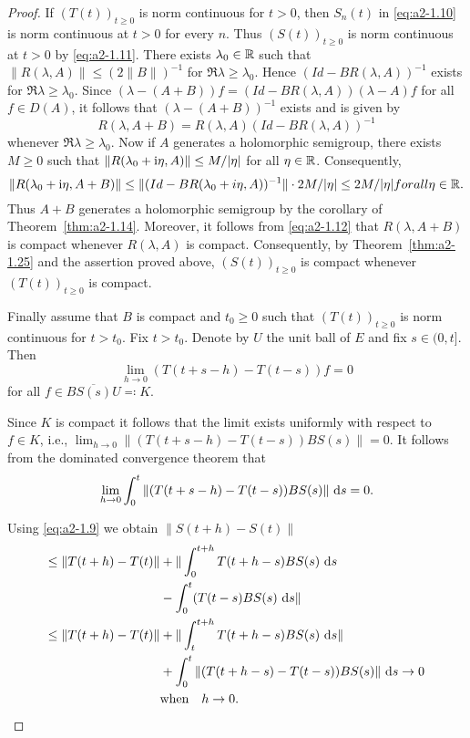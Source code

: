 \begin{proof}
If $(T(t))_{t \geq 0}$ is norm continuous for $t > 0$, then $S_{n}(t)$ in \eqref{eq:a2-1.10} is norm continuous at $t > 0$ for every $n$.
Thus $(S(t))_{t \geq 0}$ is norm continuous at $t > 0$ by \eqref{eq:a2-1.11}.
There exists $\lambda_{0} \in \mathbb{R}$ such that 
$\|R(\lambda,A)\| \leq (2\|B\|)^{-1}$ for $\Re\lambda \geq \lambda_{0}$.
Hence $(Id - BR(\lambda,A))^{-1}$ exists for $\Re\lambda \geq \lambda_{0}$.
Since $(\lambda-(A+B))f = (Id-BR(\lambda,A))(\lambda-A)f$ for all $f \in D(A)$, it follows that $(\lambda-(A+B))^{-1}$ exists and is given by
\begin{equation}\label{eq:a2-1.12}
    R(\lambda,A+B) = R(\lambda,A)(Id-BR(\lambda,A))^{-1}
\end{equation}
whenever $\Re\lambda \geq \lambda_{0}$.
Now if $A$ generates a holomorphic semigroup,
there exists $M \geq 0$ such that $\|R(\lambda_{0}+\mathrm{i}\eta,A)\| \leq M/|\eta|$ for all $\eta \in \mathbb{R}$.
Consequently, 
\[
\|R(\lambda_{0}+\mathrm{i}\eta,A+B)\| \leq \|(Id-BR(\lambda_{0}+i\eta,A))^{-1}\| \cdot 2M/|\eta| \leq 2M/|\eta|
for all \eta \in \mathbb{R} .
\]
Thus $A + B$ generates a holomorphic semigroup by the corollary of Theorem~\ref{thm:a2-1.14}.
Moreover, it follows from \eqref{eq:a2-1.12}  that $R(\lambda,A+B)$ is compact whenever $R(\lambda,A)$  is compact.
Consequently, by Theorem~\ref{thm:a2-1.25} and the  assertion proved above, $(S(t))_{t \geq 0}$ is compact whenever $(T(t))_{t \geq 0}$ is compact.

Finally assume that $B$ is compact and $t_{0} \geq 0$ such that $(T(t))_{t \geq 0}$ 
is norm continuous for $t > t_{0}$.
Fix $t > t_{0}$.
Denote by $U$ the unit ball of $E$ and fix $s \in (0,t]$.
Then
\[
    \lim_{h \to 0} (T(t+s-h) - T(t-s))f = 0
\]
for all $f \in \overline{BS(s)U} \eqqcolon K$.

Since $K$ is compact it follows that the limit exists uniformly with respect to $f \in K$, i.e., 
$\lim_{h \to 0} \|(T(t+s-h) - T(t-s))BS(s)\| = 0$.
It follows from the dominated convergence theorem that
\begin{equation}\label{eq:a2-1.13}
    \lim_{h \to 0} \int_{0}^{t} \|(T(t+s-h) - T(t-s))BS(s)\|\, \mathop{}\!\mathrm{d}{s} = 0.
\end{equation}
 
Using  \eqref{eq:a2-1.9}  we obtain $\|S(t+h) - S(t)\|$ 
\begin{align*}
\leq \|T(t+h) - T(t)\| &+ \|\int_{0}^{t+h} T(t+h-s)BS(s)\, \ds\ \hfill \\
 &- \int_{0}^{t} (T(t-s)BS(s)\, \ds\| \hfill \\
\leq \|T(t+h) - T(t)\| &+ \|\int_{t}^{t+h} T(t+h-s)BS(s)\, \ds\| \hfill \\ 
 &+ \int_{0}^{t} \|(T(t+h-s) - T(t-s))BS(s)\|\, \ds \to 0 \hfill \\
 &\text{when}  \quad h \to 0. \hfill 	
\end{align*}
\end{proof}
